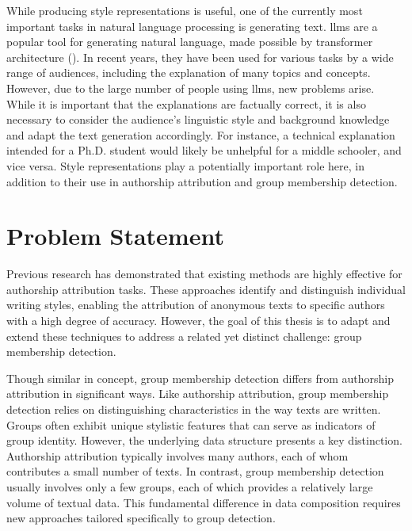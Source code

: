 While producing style representations is useful, one of the currently most important tasks in natural language processing is generating text. \Acp{llm} are a popular tool for generating natural language, made possible by transformer architecture (\cite{NIPS2017_3f5ee243}). In recent years, they have been used for various tasks by a wide range of audiences, including the explanation of many topics and concepts. However, due to the large number of people using \acp{llm}, new problems arise. While it is important that the explanations are factually correct, it is also necessary to consider the audience's linguistic style and background knowledge and adapt the text generation accordingly. For instance, a technical explanation intended for a Ph.D. student would likely be unhelpful for a middle schooler, and vice versa. Style representations play a potentially important role here, in addition to their use in authorship attribution and group membership detection.


\section{Problem Statement}
\label{sec:introduction:problemStatement}

Previous research has demonstrated that existing methods are highly effective for authorship attribution tasks. These approaches identify and distinguish individual writing styles, enabling the attribution of anonymous texts to specific authors with a high degree of accuracy. However, the goal of this thesis is to adapt and extend these techniques to address a related yet distinct challenge: group membership detection.

Though similar in concept, group membership detection differs from authorship attribution in significant ways. Like authorship attribution, group membership detection relies on distinguishing characteristics in the way texts are written. Groups often exhibit unique stylistic features that can serve as indicators of group identity. However, the underlying data structure presents a key distinction. Authorship attribution typically involves many authors, each of whom contributes a small number of texts. In contrast, group membership detection usually involves only a few groups, each of which provides a relatively large volume of textual data. This fundamental difference in data composition requires new approaches tailored specifically to group detection.

